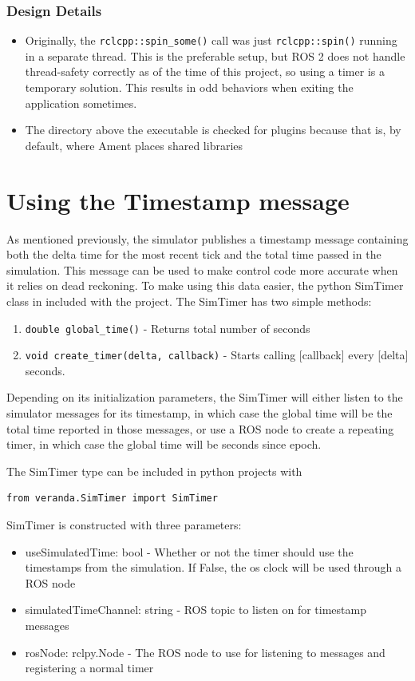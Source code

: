 \begin{itemize}
\subsubsection*{Design Details}
\begin{itemize}
	\item Originally, the \lstinline|rclcpp::spin_some()| call was just \lstinline|rclcpp::spin()| running in a separate thread. This is the preferable setup, but ROS 2 does not handle thread-safety correctly as of the time of this project, so using a timer is a temporary solution. This results in odd behaviors when exiting the application sometimes.
	\item The directory above the executable is checked for plugins because that is, by default, where Ament places shared libraries
\end{itemize}

\section{Using the Timestamp message}
As mentioned previously, the simulator publishes a timestamp message containing both the delta time for the most recent tick and the total time passed in the simulation. This message can be used to make control code more accurate when it relies on dead reckoning. To make using this data easier, the python SimTimer class in included with the project. The SimTimer has two simple methods:
\begin{enumerate}
	\item \lstinline|double global_time()| - Returns total number of seconds
	\item \lstinline|void create_timer(delta, callback)| - Starts calling [callback] every [delta] seconds.
\end{enumerate}

Depending on its initialization parameters, the SimTimer will either listen to the simulator messages for its timestamp, in which case the global time will be the total time reported in those messages, or use a ROS node to create a repeating timer, in which case the global time will be seconds since epoch.

The SimTimer type can be included in python projects with \begin{lstlisting}
from veranda.SimTimer import SimTimer
\end{lstlisting}

SimTimer is constructed with three parameters:
\begin{itemize}
	\item useSimulatedTime: bool - Whether or not the timer should use the timestamps from the simulation. If False, the os clock will be used through a ROS node
	\item simulatedTimeChannel: string - ROS topic to listen on for timestamp messages
	\item rosNode: rclpy.Node - The ROS node to use for listening to messages and registering a normal timer
\end{itemize}


\end{itemize}
